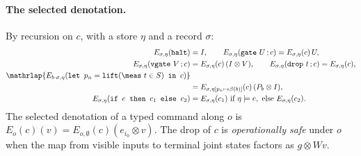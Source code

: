 \documentclass[acmsmall,screen,review,anonymous,nonacm]{acmart}
\begin{document}
\paragraph{The selected denotation.} By recursion on $c$, with a store $\eta$
and a record $\sigma$:
\[
\begin{aligned}
 E_{\sigma,\eta}(\texttt{halt}) &= I, \qquad
 E_{\sigma,\eta}(\texttt{gate}\ U\,;c) = E_{\sigma,\eta}(c)\,U, \\
 E_{\sigma,\eta}(\texttt{vgate}\ V\,;c) &= E_{\sigma,\eta}(c)\,(I \otimes V), \qquad
 E_{\sigma,\eta}(\drop\ t\,;c) = E_{\sigma,\eta}(c), \\
 \mathrlap{E_{b\cdot\sigma,\eta}(\texttt{let }p_n=\lift(\meas\ t\in S)\texttt{ in }c)} \\
   &= E_{\sigma,\eta[p_n\mapsto\beta(b)]}(c)\,(P_b \otimes I),\\
 E_{\sigma,\eta}(\texttt{if } e \texttt{ then } c_1 \texttt{ else } c_2)
   &= E_{\sigma,\eta}(c_1) \ \text{if } \eta \models e, \ \text{else }
     E_{\sigma,\eta}(c_2).
\end{aligned}
\]
The selected denotation of a typed command along $o$ is $E_o(c)(v) =
E_{o,\emptyset}(c)(e_{i_0} \otimes v)$. The drop of $c$ is
\emph{operationally safe} under $o$ when the map from visible inputs to
terminal joint states factors as $g \otimes Wv$.

\stmtMeta
\end{document}

